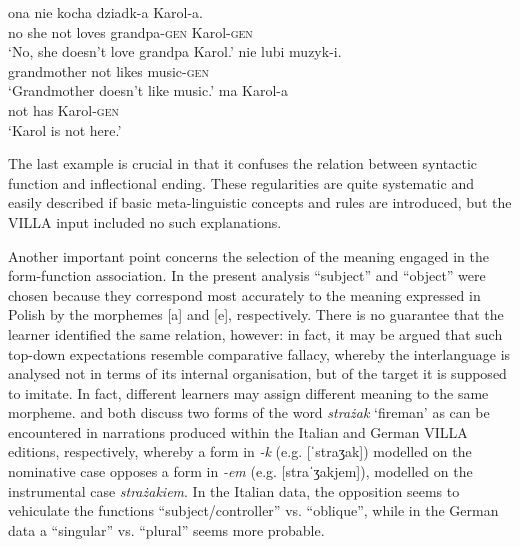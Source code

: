 \ea%
    \label{ex:08:6}
    \ea\label{ex:08:6a}
       {ona}   {nie}   {kocha}   {dziadk-a}   {Karol-a.} \\
            no  she  not  loves  grandpa-\textsc{gen}  Karol-\textsc{gen} \\
    \glt    ‘No, she doesn't love grandpa Karol.’
    \ex\label{ex:08:6b}
       {nie}   {lubi}   {muzyk-i.}\\
            grandmother  not  likes  music-\textsc{gen}\\
    \glt    ‘Grandmother doesn't like music.’
    \ex\label{ex:08:6c}
      {ma}  {Karol-a}\\
            not  has  Karol-\textsc{gen}\\
    \glt    ‘Karol is not here.’
    \z
\z

The last example is crucial in that it confuses the relation between syntactic function and inflectional ending. These regularities are quite systematic and easily described if basic meta-linguistic concepts and rules are introduced, but the VILLA input included no such explanations. 

Another important point concerns the selection of the meaning engaged in the form-function association. In the present analysis “subject” and “object” were chosen because they correspond most accurately to the meaning expressed in Polish by the morphemes [a] and [e], respectively. There is no guarantee that the learner identified the same relation, however: in fact, it may be argued that such top-down expectations resemble  comparative fallacy, whereby the interlanguage is analysed not in terms of its internal organisation, but of the target it is supposed to imitate. In fact, different learners may assign different meaning to the same morpheme. \citet{Bernini2018a} and \citet[28-33]{Dimroth2018} both discuss two forms of the word \textit{strażak} ‘fireman’ as can be encountered in narrations produced within the Italian and German VILLA editions, respectively, whereby a form in \textit{{}-k} (e.g. [ˈstraʒak]) modelled on the nominative case opposes a form in \textit{{}-em} (e.g. [straˈʒakjem]), modelled on the instrumental case \textit{strażakiem}. In the Italian data, the opposition seems to vehiculate the functions “subject/controller” vs. “oblique”, while in the German data a “singular” vs. “plural” seems more probable.

